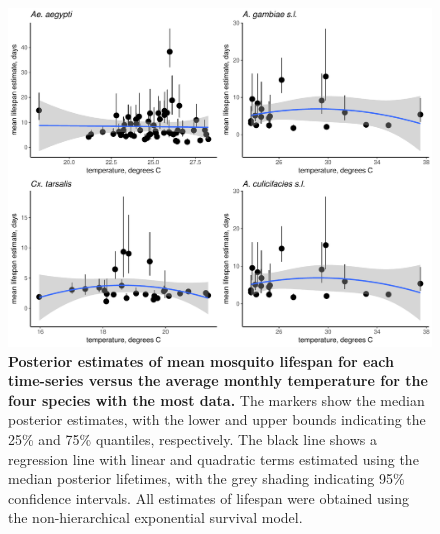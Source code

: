 \documentclass[12pt]{article}
\begin{document}
{\begin{figure}[h]
	\centerline{\includegraphics[width=1\textwidth]{./Figure_files/mrr_ThreeSpeciesVersusTemperature.pdf}}
	\caption{\textbf{Posterior estimates of mean mosquito lifespan for each time-series versus the average monthly temperature for the four species with the most data.} The markers show the median posterior estimates, with the lower and upper bounds indicating the 25\% and 75\% quantiles, respectively. The black line shows a regression line with linear and quadratic terms estimated using the median posterior lifetimes, with the grey shading indicating 95\% confidence intervals. All estimates of lifespan were obtained using the non-hierarchical exponential survival model.}\label{fig:mrr_ThreeSpeciesVersusTemperature}
\end{figure}


}
\end{document}
